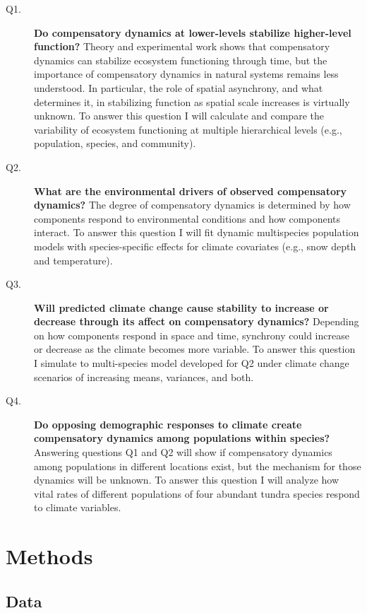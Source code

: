 \documentclass[12pt,]{article}
\begin{document}
\begin{description}

\item[Q1.] \textbf{Do compensatory dynamics at lower-levels stabilize higher-level function?} Theory and experimental work shows that compensatory dynamics can stabilize ecosystem functioning through time, but the importance of compensatory dynamics in natural systems remains less understood. In particular, the role of spatial asynchrony, and what determines it, in stabilizing function as spatial scale increases is virtually unknown. To answer this question I will calculate and compare the variability of ecosystem functioning at multiple hierarchical levels (e.g., population, species, and community).

\item[Q2.] \textbf{What are the environmental drivers of observed compensatory dynamics?} The degree of compensatory dynamics is determined by how components respond to environmental conditions and how components interact. To answer this question I will fit dynamic multispecies population models with species-specific effects for climate covariates (e.g., snow depth and temperature).

\item[Q3.] \textbf{Will predicted climate change cause stability to increase or decrease through its affect on compensatory dynamics?} Depending on how components respond in space and time, synchrony could increase or decrease as the climate becomes more variable. To answer this question I simulate to multi-species model developed for Q2 under climate change scenarios of increasing means, variances, and both.

\item[Q4.] \textbf{Do opposing demographic responses to climate create compensatory dynamics among populations within species?} Answering questions Q1 and Q2 will show if compensatory dynamics among populations in different locations exist, but the mechanism for those dynamics will be unknown. To answer this question I will analyze how vital rates of different populations of four abundant tundra species respond to climate variables.

\end{description}

\section{Methods}\subsection{Data}
\end{document}
